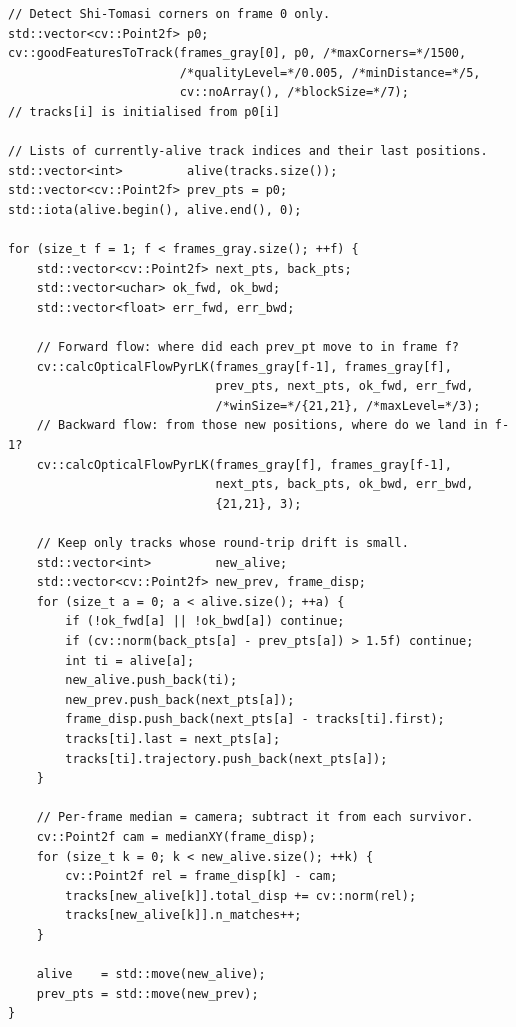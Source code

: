 \documentclass[11pt,a4paper]{article}
\begin{document}
\begin{lstlisting}[caption={The main loop inside \texttt{trackFeatures}.}]
// Detect Shi-Tomasi corners on frame 0 only.
std::vector<cv::Point2f> p0;
cv::goodFeaturesToTrack(frames_gray[0], p0, /*maxCorners=*/1500,
                        /*qualityLevel=*/0.005, /*minDistance=*/5,
                        cv::noArray(), /*blockSize=*/7);
// tracks[i] is initialised from p0[i]

// Lists of currently-alive track indices and their last positions.
std::vector<int>         alive(tracks.size());
std::vector<cv::Point2f> prev_pts = p0;
std::iota(alive.begin(), alive.end(), 0);

for (size_t f = 1; f < frames_gray.size(); ++f) {
    std::vector<cv::Point2f> next_pts, back_pts;
    std::vector<uchar> ok_fwd, ok_bwd;
    std::vector<float> err_fwd, err_bwd;

    // Forward flow: where did each prev_pt move to in frame f?
    cv::calcOpticalFlowPyrLK(frames_gray[f-1], frames_gray[f],
                             prev_pts, next_pts, ok_fwd, err_fwd,
                             /*winSize=*/{21,21}, /*maxLevel=*/3);
    // Backward flow: from those new positions, where do we land in f-1?
    cv::calcOpticalFlowPyrLK(frames_gray[f], frames_gray[f-1],
                             next_pts, back_pts, ok_bwd, err_bwd,
                             {21,21}, 3);

    // Keep only tracks whose round-trip drift is small.
    std::vector<int>         new_alive;
    std::vector<cv::Point2f> new_prev, frame_disp;
    for (size_t a = 0; a < alive.size(); ++a) {
        if (!ok_fwd[a] || !ok_bwd[a]) continue;
        if (cv::norm(back_pts[a] - prev_pts[a]) > 1.5f) continue;
        int ti = alive[a];
        new_alive.push_back(ti);
        new_prev.push_back(next_pts[a]);
        frame_disp.push_back(next_pts[a] - tracks[ti].first);
        tracks[ti].last = next_pts[a];
        tracks[ti].trajectory.push_back(next_pts[a]);
    }

    // Per-frame median = camera; subtract it from each survivor.
    cv::Point2f cam = medianXY(frame_disp);
    for (size_t k = 0; k < new_alive.size(); ++k) {
        cv::Point2f rel = frame_disp[k] - cam;
        tracks[new_alive[k]].total_disp += cv::norm(rel);
        tracks[new_alive[k]].n_matches++;
    }

    alive    = std::move(new_alive);
    prev_pts = std::move(new_prev);
}
\end{lstlisting}
\end{document}
